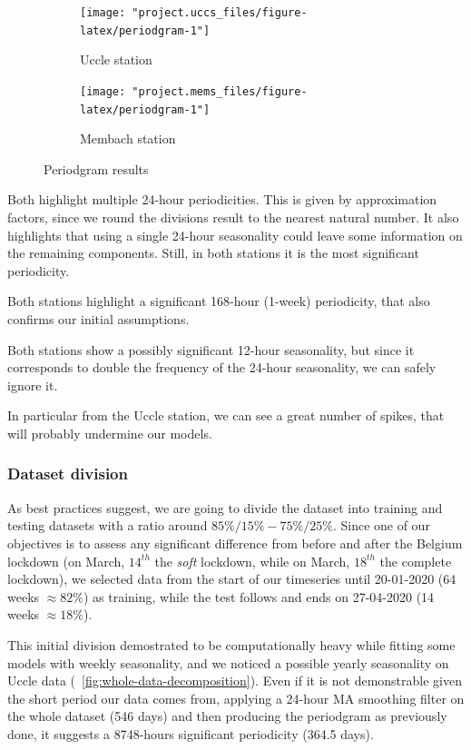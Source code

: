 \documentclass[12pt]{article}
\begin{document}
\begin{figure}[h]
	\begin{subfigure}{.5\linewidth}
		\texttt{[image: "project.uccs\_files/figure-latex/periodgram-1"]}
		\caption{Uccle station}
		\label{fig:periodgram:uccs}
	\end{subfigure}
	\begin{subfigure}{.5\linewidth}
		\texttt{[image: "project.mems\_files/figure-latex/periodgram-1"]}
		\caption{Membach station}
		\label{fig:periodgram:mems}
	\end{subfigure}
	\caption{Periodgram results}
	\label{fig:periodgram}
\end{figure}

Both highlight multiple 24-hour periodicities. This is given by approximation factors, since we round the divisions result to the nearest natural number. It also highlights that using a single 24-hour seasonality could leave some information on the remaining components. Still, in both stations it is the most significant periodicity.

Both stations highlight a significant 168-hour (1-week) periodicity, that also confirms our initial assumptions.

Both stations show a possibly significant 12-hour seasonality, but since it corresponds to double the frequency of the 24-hour seasonality, we can safely ignore it.

In particular from the Uccle station, we can see a great number of spikes, that will probably undermine our models.


\subsubsection{Dataset division}
As best practices suggest, we are going to divide the dataset into training and testing datasets with a ratio around $85\%/15\% - 75\%/25\%$.
Since one of our objectives is to assess any significant difference from before and after the Belgium lockdown (on March, $14^{th}$ the \textit{soft} lockdown, while on March, $18^{th}$ the complete lockdown), we selected data from the start of our timeseries until 20-01-2020 (64 weeks $\approx 82\%$) as training, while the test follows and ends on 27-04-2020 (14 weeks $\approx 18\%$).

This initial division demostrated to be computationally heavy while fitting some models with weekly seasonality, and we noticed a possible yearly seasonality on Uccle data (\figurename~\ref{fig:whole-data-decomposition}). Even if it is not demonstrable given the short period our data comes from, applying a 24-hour MA smoothing filter on the whole dataset (546 days) and then producing the periodgram as previously done, it suggests a 8748-hours significant periodicity (364.5 days).
\end{document}

